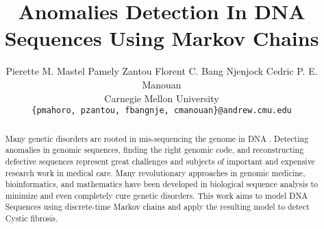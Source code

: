 \documentclass[10pt,twocolumn,letterpaper]{article}
\begin{document}
\title{Anomalies Detection In DNA Sequences Using Markov Chains}

\author{Pierette M. Mastel \quad Pamely Zantou \quad Florent C. Bang Njenjock \quad Cedric P. E. Manouan \\
Carnegie Mellon University\\
{\tt\small \{pmahoro, pzantou, fbangnje, cmanouan\}@andrew.cmu.edu}
}

\maketitle
\thispagestyle{empty}

\begin{abstract}
    Many genetic disorders are rooted in mis-sequencing the
    genome in DNA \cite{posey}. Detecting anomalies in genomic sequences, finding the right genomic code, and reconstructing
    defective sequences represent great challenges and subjects
    of important and expensive research work in medical care.
    Many revolutionary approaches in genomic medicine, bioinformatics, and mathematics have been developed in biological
    sequence analysis to minimize and even completely cure
    genetic disorders. This work aims to model DNA Sequences
    using discrete-time Markov chains and apply the resulting model to detect Cystic fibrosis. 
\end{abstract}


\end{document}
